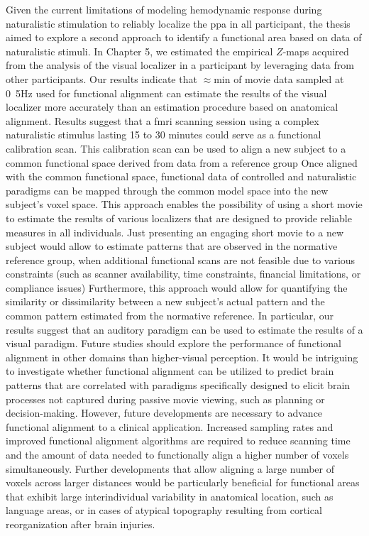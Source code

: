 %
Given the current limitations of modeling hemodynamic response during
naturalistic stimulation to reliably localize the \ac{ppa} in all participant,
the thesis aimed to explore a second approach to identify a functional area
based on data of naturalistic stimuli.
%
In Chapter 5, we estimated the empirical $Z$-maps acquired from the analysis of
the visual localizer \citet{sengupta2016extension} in a participant by
leveraging data from other participants.
%
Our results indicate that $\approx$\unit[15]{min} of movie data sampled at
\unit{0.5}{Hz} used for functional alignment can estimate the results of the
visual localizer more accurately than an estimation procedure based on
anatomical alignment.
%
Results suggest that a \ac{fmri} scanning session using a complex naturalistic
stimulus lasting 15 to 30 minutes could serve as a functional calibration scan.
%
This calibration scan can be used to align a new subject to a common functional
space derived from data from a reference group
%
Once aligned with the common functional space, functional data of controlled and
naturalistic paradigms can be mapped through the common model space into the new
subject's voxel space.
%
This approach enables the possibility of using a short movie to estimate the
results of various localizers that are designed to provide reliable measures in
all individuals.
%
Just presenting an engaging short movie to a new subject would allow to estimate
patterns that are observed in the normative reference group, when additional
functional scans are not feasible due to various constraints (such as scanner
availability, time constraints, financial limitations, or compliance issues)
%
Furthermore, this approach would allow for quantifying the similarity or
dissimilarity between a new subject's actual pattern and the common pattern
estimated from the normative reference.
%
In particular, our results suggest that an auditory paradigm can be used to
estimate the results of a visual paradigm.
%
Future studies should explore the performance of functional alignment in other
domains than higher-visual perception.
%
It would be intriguing to investigate whether functional alignment can be
utilized to predict brain patterns that are correlated with paradigms
specifically designed to elicit brain processes not captured during passive
movie viewing, such as planning or decision-making.
%
However, future developments are necessary to advance functional alignment to a
clinical application.
%
Increased sampling rates and improved functional alignment algorithms are
required to reduce scanning time and the amount of data needed to functionally
align a higher number of voxels simultaneously.
%
Further developments that allow aligning a large number of voxels across larger
distances would be particularly beneficial for functional areas that exhibit
large interindividual variability in anatomical location, such as language
areas, or in cases of atypical topography resulting from cortical reorganization
after brain injuries.


